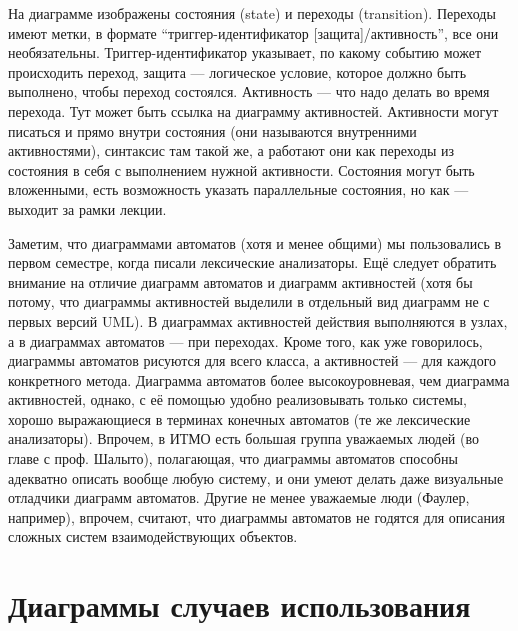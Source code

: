 \documentclass[a5paper]{article}
\begin{document}
На диаграмме изображены состояния (state) и переходы (transition). Переходы имеют метки, в формате ``триггер-идентификатор [защита]/активность'', все они необязательны. Триггер-идентификатор указывает, по какому событию может происходить переход, защита --- логическое условие, которое должно быть выполнено, чтобы переход состоялся. Активность --- что надо делать во время перехода. Тут может быть ссылка на диаграмму активностей. Активности могут писаться и прямо внутри состояния (они называются внутренними активностями), синтаксис там такой же, а работают они как переходы из состояния в себя с выполнением нужной активности. Состояния могут быть вложенными, есть возможность указать параллельные состояния, но как --- выходит за рамки лекции.

Заметим, что диаграммами автоматов (хотя и менее общими) мы пользовались в первом семестре, когда писали лексические анализаторы. Ещё следует обратить внимание на отличие диаграмм автоматов и диаграмм активностей (хотя бы потому, что диаграммы активностей выделили в отдельный вид диаграмм не с первых версий UML). В диаграммах активностей действия выполняются в узлах, а в диаграммах автоматов --- при переходах. Кроме того, как уже говорилось, диаграммы автоматов рисуются для всего класса, а активностей --- для каждого конкретного метода. Диаграмма автоматов более высокоуровневая, чем диаграмма активностей, однако, с её помощью удобно реализовывать только системы, хорошо выражающиеся в терминах конечных автоматов (те же лексические анализаторы). Впрочем, в ИТМО есть большая группа уважаемых людей (во главе с проф. Шалыто), полагающая, что диаграммы автоматов способны адекватно описать вообще любую систему, и они умеют делать даже визуальные отладчики диаграмм автоматов. Другие не менее уважаемые люди (Фаулер, например), впрочем, считают, что диаграммы автоматов не годятся для описания сложных систем взаимодействующих объектов.

\section{Диаграммы случаев использования}
\end{document}
